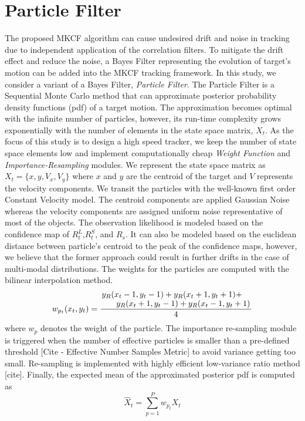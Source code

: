 \documentclass[10pt,twocolumn,letterpaper]{article}
\newcounter{ct}
\begin{document}
\section{Particle Filter}
\label{sc:PF}
The proposed MKCF algorithm can cause undesired drift and noise in tracking due to independent application of the correlation filters. To mitigate the drift effect and reduce the noise, a Bayes Filter representing the evolution of target's motion can be added into the MKCF tracking framework. In this study, we consider a variant of a Bayes Filter, \textit{Particle Filter}. The Particle Filter is a Sequential Monte Carlo method that can approximate posterior probability density functions (pdf) of a target motion. The approximation becomes optimal with the infinite number of particles, however, its run-time complexity grows exponentially with the number of elements in the state space matrix, $X_{t}$. As the focus of this study is to design a high speed tracker, we keep the number of state space elements low and implement computationally cheap \textit{Weight Function} and \textit{Importance-Resampling} modules. We represent the state space matrix as $X_{t} = \lbrace x,y,V_{x},V_{y}\rbrace$ where $x$ and $y$ are the centroid of the target and $V$ represents the velocity components. We transit the particles with the well-known first order Constant Velocity model. The centroid components are applied Gaussian Noise whereas the velocity components are assigned uniform noise representative of most of the objects. The observation likelihood is modeled based on the confidence map of $R_{t}^{L}$,$R_{t}^{S}$, and $R_{s}$. It can also be modeled based on the euclidean distance between particle's centroid to the peak of the confidence maps, however, we believe that the former approach could result in further drifts in the case of multi-modal distributions. The weights for the particles are computed with the bilinear interpolation method.
\begin{equation}
	w_{p_{t}}(x_{t},y_{t}) = \dfrac{\splitfrac{y_{R}(x_{t}-1,y_{t}-1)+y_{R}(x_{t}+1,y_{t}+1)+}{y_{R}(x_{t}+1,y_{t}-1)+y_{R}(x_{t}-1,y_{t}+1)}}{4}
\end{equation}
where $w_{p}$ denotes the weight of the particle. The importance re-sampling module is triggered when the number of effective particles is smaller than a pre-defined threshold [Cite - Effective Number Samples Metric] to avoid variance getting too small. Re-sampling is implemented with highly efficient low-variance ratio method [cite]. Finally, the expected mean of the approximated posterior pdf is computed as
\begin{equation}
	\hat{X}_{t} = \sum_{p=1}^{P}w_{p_{t}} X_{t}
\end{equation}
\end{document}
